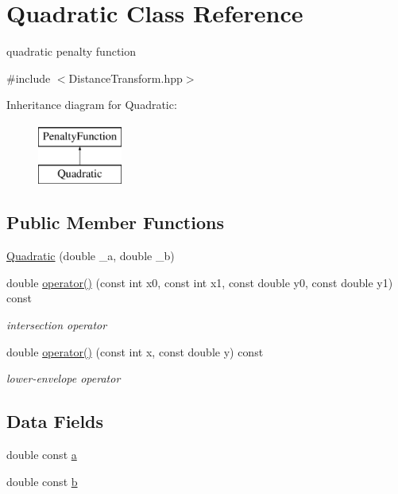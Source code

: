 \hypertarget{classQuadratic}{\section{\-Quadratic \-Class \-Reference}
\label{classQuadratic}
}


quadratic penalty function  




{\ttfamily \#include $<$\-Distance\-Transform.\-hpp$>$}

\-Inheritance diagram for \-Quadratic\-:\begin{figure}[H]
\begin{center}
\leavevmode
\includegraphics[height=2.000000cm]{classQuadratic}
\end{center}
\end{figure}
\subsection*{\-Public \-Member \-Functions}
\begin{DoxyCompactItemize}
\item 
\hyperlink{classQuadratic_aa5d5e8e58a9d0aaf332e6b8b879430b8}{\-Quadratic} (double \-\_\-a, double \-\_\-b)
\item 
double \hyperlink{classQuadratic_ad074fa92b51e0590f6621b60ac01219a}{operator()} (const int x0, const int x1, const double y0, const double y1) const 
\begin{DoxyCompactList}\small\item\em intersection operator \end{DoxyCompactList}\item 
double \hyperlink{classQuadratic_ae1f3f6d71209aafe6bb1636a8c17489c}{operator()} (const int x, const double y) const 
\begin{DoxyCompactList}\small\item\em lower-\/envelope operator \end{DoxyCompactList}\end{DoxyCompactItemize}
\subsection*{\-Data \-Fields}
\begin{DoxyCompactItemize}
\item 
double const \hyperlink{classQuadratic_a3784ebac36b04b9195d44d6d5bc8933a}{a}
\item 
double const \hyperlink{classQuadratic_a1df1154ac27afe4533b5b695831ed23a}{b}
\end{DoxyCompactItemize}
